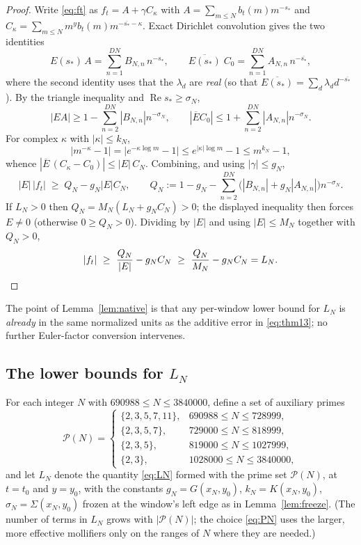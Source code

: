 \documentclass[11pt]{article}
\theoremstyle{definition}
\newcommand{\calP}{\mathcal{P}}
\DeclareMathOperator{\Rea}{Re}
\begin{document}
\begin{proof}
Write \eqref{eq:ft} as $f_t=A+\gamma C_\kappa$ with
$A=\sum_{m\le N}b_t(m)m^{-s_*}$ and
$C_\kappa=\sum_{m\le N}m^yb_t(m)m^{-\overline{s_*}-\kappa}$. Exact
Dirichlet convolution gives the two identities
\begin{equation}\label{eq:conv}
E(s_*)\,A=\sum_{n=1}^{DN}B_{N,n}\,n^{-s_*},
\qquad
\overline{E(s_*)}\;C_0=\sum_{n=1}^{DN}A_{N,n}\,n^{-\overline{s_*}} ,
\end{equation}
where the second identity uses that the $\lambda_d$ are \emph{real}
(so that $\overline{E(s_*)}=\sum_d\lambda_d d^{-\overline{s_*}}$).
By the triangle inequality and $\Rea s_*\ge\sigma_N$,
\[
|EA|\ge1-\sum_{n=2}^{DN}|B_{N,n}|n^{-\sigma_N},
\qquad
|\overline EC_0|\le1+\sum_{n=2}^{DN}|A_{N,n}|n^{-\sigma_N}.
\]
For complex $\kappa$ with $|\kappa|\le k_N$,
\begin{equation}\label{eq:kappaest}
|m^{-\kappa}-1|=\bigl|e^{-\kappa\log m}-1\bigr|
\le e^{|\kappa|\log m}-1\le m^{k_N}-1,
\end{equation}
whence $|\overline E\,(C_\kappa-C_0)|\le|E|\,C_N$. Combining, and
using $|\gamma|\le g_N$,
\[
|E|\,|f_t|\;\ge\;Q_N-g_N|E|C_N,
\qquad
Q_N:=1-g_N-\sum_{n=2}^{DN}\bigl(|B_{N,n}|+g_N|A_{N,n}|\bigr)n^{-\sigma_N}.
\]
If $L_N>0$ then $Q_N=M_N(L_N+g_NC_N)>0$; the displayed inequality then
forces $E\ne0$ (otherwise $0\ge Q_N>0$). Dividing by $|E|$ and using
$|E|\le M_N$ together with $Q_N>0$,
\[
|f_t|\ \ge\ \frac{Q_N}{|E|}-g_NC_N
\ \ge\ \frac{Q_N}{M_N}-g_NC_N=L_N. \qedhere
\]
\end{proof}

The point of Lemma~\ref{lem:native} is that any
per-window lower bound for $L_N$ is \emph{already} in the same
normalized units as the additive error in \eqref{eq:thm13}; no
further Euler-factor conversion intervenes.

\subsection{The lower bounds for $L_N$}\label{sec:stored}

For each integer $N$ with $690988\le N\le 3840000$, define a set of
auxiliary primes
\begin{equation}\label{eq:PN}
\calP(N)=
\begin{cases}
\{2,3,5,7,11\}, & 690988\le N\le728999,\\
\{2,3,5,7\}, & 729000\le N\le818999,\\
\{2,3,5\}, & 819000\le N\le1027999,\\
\{2,3\}, & 1028000\le N\le3840000,
\end{cases}
\end{equation}
and let $L_N$ denote the quantity \eqref{eq:LN} formed with the
prime set $\calP(N)$, at $t=t_0$ and $y=y_0$, with the constants
$g_N=G(x_N,y_0)$, $k_N=K(x_N,y_0)$, $\sigma_N=\Sigma(x_N,y_0)$
frozen at the window's left edge as in Lemma~\ref{lem:freeze}. (The
number of terms in $L_N$ grows with $|\calP(N)|$; the choice
\eqref{eq:PN} uses the larger, more effective mollifiers only on the
ranges of $N$ where they are needed.)
\end{document}
